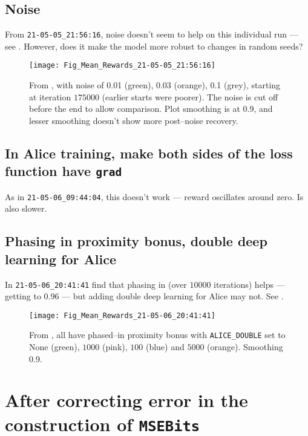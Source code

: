 \documentclass[12pt]{article}
\begin{document}
\subsection{Noise}

From \verb|21-05-05_21:56:16|, noise doesn't seem to help on this individual run --- see .  However, does it make the model more robust to changes in random seeds?
\begin{figure}
	\centering
	\texttt{[image: Fig\_Mean\_Rewards\_21-05-05\_21:56:16]}
	\caption{From , with noise of 0.01 (green), 0.03 (orange), 0.1 (grey), starting at iteration $\num{175000}$ (earlier starts were poorer).  The noise is cut off before the end to allow comparison.  Plot smoothing is at 0.9, and lesser smoothing doesn't show more post--noise recovery.}
	\label{fig:figmeanrewards21-05-05215616}
\end{figure}

\subsection{In Alice training, make both sides of the loss function have \texttt{grad}}

As in \verb|21-05-06_09:44:04|, this doesn't work --- reward oscillates around zero.  Is also slower.

\subsection{Phasing in proximity bonus, double deep learning for Alice}

In \verb|21-05-06_20:41:41| find that phasing in (over $\num{10000}$ iterations) helps --- getting to 0.96 --- but adding double deep learning for Alice may not.  See .
\begin{figure}
	\centering
	\texttt{[image: Fig\_Mean\_Rewards\_21-05-06\_20:41:41]}
	\caption{From , all have phased--in proximity bonus with \texttt{ALICE\_DOUBLE} set to $\text{None}$ (green), $\num{1000}$ (pink), $100$ (blue) and $\num{5000}$ (orange).  Smoothing 0.9.}
	\label{fig:figmeanrewards21-05-06204141}
\end{figure}

\section{After correcting error in the construction of \texttt{MSEBits}}
	
\end{document}
